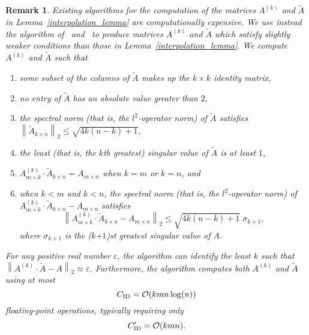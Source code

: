 \documentclass[final,3p,times]{elsarticle}
\def\epsilon{\varepsilon}
\def\bigoh{\mathcal{O}}
\newtheorem{remark1}[theorem]{Remark}
\newenvironment{remark}{\begin{remark1}\rm}{\end{remark1}}
\begin{document}
\begin{remark}
\label{QR_algorithm}
Existing algorithms for the computation of the matrices $A^{(k)}$
and $\widetilde{A}$ in Lemma~\ref{interpolation_lemma}
are computationally expensive.
We use instead the algorithm of~\cite{cheng-gimbutas-martinsson-rokhlin}
and~\cite{gu-eisenstat96}
to produce matrices $A^{(k)}$ and $\widetilde{A}$
which satisfy slightly weaker conditions than those
in Lemma~\ref{interpolation_lemma}.
We compute $A^{(k)}$ and $\widetilde{A}$ such that
\begin{enumerate}
\item some subset of the columns of $\widetilde{A}$ makes up
the $k \times k$ identity matrix,
\item \label{computable_bound1}
no entry of $\widetilde{A}$ has an absolute value greater than $2$,
\item the spectral norm (that is, the $l^2$-operator norm) of $\widetilde{A}$
satisfies
$\left\| \widetilde{A}_{k \times n} \right\|_2 \le \sqrt{4 k (n-k) + 1}$,
\item the least (that is, the $k$th greatest) singular value
of $\widetilde{A}$ is at least $1$,
\item \label{exact}
$A^{(k)}_{m \times k} \cdot \widetilde{A}_{k \times n} = A_{m \times n}$
when $k = m$ or $k = n$, and
\item when $k < m$ and $k < n$, the spectral norm
(that is, the $l^2$-operator norm)
of $A^{(k)}_{m \times k} \cdot \widetilde{A}_{k \times n} - A_{m \times n}$
satisfies
\begin{equation}
\label{computable_bound2}
\left\| A^{(k)}_{m \times k} \cdot \widetilde{A}_{k \times n}
- A_{m \times n} \right\|_2 \le \sqrt{4 k (n-k) + 1} \; \sigma_{k+1},
\end{equation}
where $\sigma_{k+1}$ is the ($k$+$1$)st greatest singular value of $A$.
\end{enumerate}
For any positive real number $\epsilon$,
the algorithm can identify the least $k$ such that
$\left\| A^{(k)} \cdot \widetilde{A} - A \right\|_2 \approx \epsilon$.
Furthermore, the algorithm computes both $A^{(k)}$ and $\widetilde{A}$
using at most
\begin{equation}
\label{ID}
C_{\rm ID} = \bigoh(k m n \log(n))
\end{equation}
floating-point operations, typically requiring only
\begin{equation}
\label{ID2}
C'_{\rm ID} = \bigoh(k m n).
\end{equation}
\end{remark}
\end{document}
